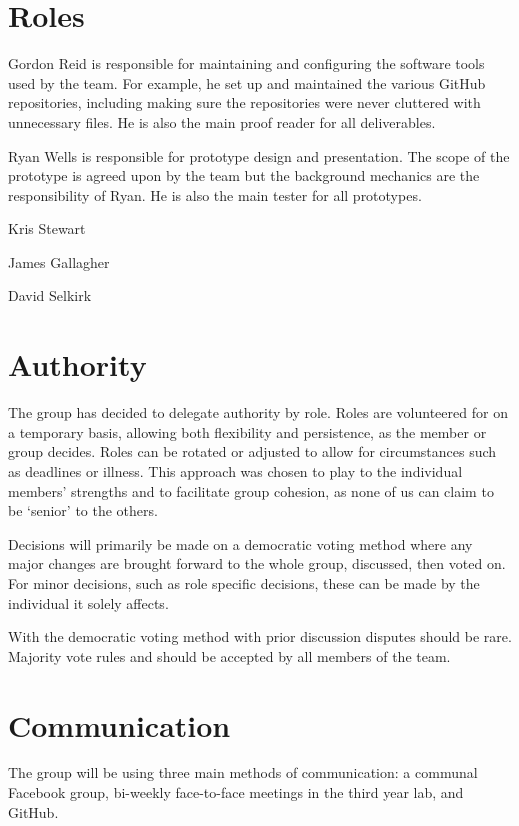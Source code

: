 \documentclass{l3deliverable}
\begin{document}
\pagebreak

\section{Roles}

Gordon Reid is responsible for maintaining and configuring the software tools
used by the team. For example, he set up and maintained the various GitHub
repositories, including making sure the repositories were never cluttered
with unnecessary files. He is also the main proof reader for all
deliverables.

Ryan Wells is responsible for prototype design and presentation. The scope
of the prototype is agreed upon by the team but the background mechanics
are the responsibility of Ryan. He is also the main tester for all prototypes.

Kris Stewart

James Gallagher

David Selkirk

\section{Authority}

The group has decided to delegate authority by role. Roles are volunteered for
on a temporary basis, allowing both flexibility and persistence, as the
member or group decides. Roles can be rotated or adjusted to allow for
circumstances such as deadlines or illness. This approach was chosen to play
to the individual members' strengths and to facilitate group cohesion, as none
of us can claim to be `senior' to the others.

Decisions will primarily be made on a democratic voting method where any
major changes are brought forward to the whole group, discussed, then voted
on. For minor decisions, such as role specific decisions, these can be made
by the individual it solely affects.

With the democratic voting method with prior discussion disputes should be
rare. Majority vote rules and should be accepted by all members of the team.

\section{Communication}
\label{sec:com}

The group will be using three main methods of communication: a communal
Facebook group, bi-weekly face-to-face meetings in the third year lab,
and GitHub.
\end{document}
